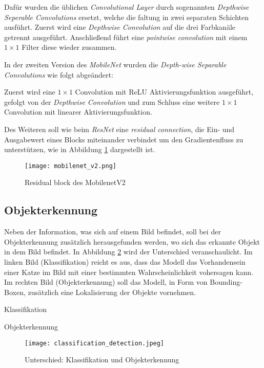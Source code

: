 Dafür wurden die üblichen \textit{Convolutional Layer}
durch sogenannten \textit{Depthwise Seperable 
Convolutions} ersetzt, welche die \Gls{faltung} in zwei separaten 
Schichten ausführt. Zuerst wird eine \textit{Depthwise  
Convolution} auf die drei Farbkanäle getrennt ausgeführt.
Anschließend führt eine \textit{pointwise convolution}
mit einem $1\times1$ Filter diese wieder zusammen.


In der zweiten Version des \textit{MobileNet}
\cite{sandlerMobileNetV2InvertedResiduals2019}
wurden die \textit{Depth-wise Separable Convolutions}
wie folgt abgeändert:

Zuerst wird eine $1\times1$ Convolution mit ReLU
Aktivierungsfunktion ausgeführt, gefolgt
von der \textit{Depthwise Convolution} und zum 
Schluss eine weitere $1\times1$ Convolution 
mit linearer Aktivierungsfunktion.


Des Weiteren soll wie beim \textit{ResNet} eine 
\textit{residual connection}, die Ein- und
Ausgabewert eines Blocks miteinander verbindet um
den Gradientenfluss zu unterstützen, wie in Abbildung 
\ref{fig:mobilenetv2} dargestellt ist.
\vspace{1cm}

\begin{figure}[H]
    \centering
    \texttt{[image: mobilenet\_v2.png]}
    \caption{Residual block des MobilenetV2
    \cite{sandlerMobileNetV2InvertedResiduals2019}}
    \label{fig:mobilenetv2}
\end{figure}


\subsection{Objekterkennung}\label{subsec:objdet_det}

Neben der Information, was sich auf einem Bild befindet, 
soll bei der Objekterkennung zusätzlich herausgefunden werden, 
wo sich das erkannte Objekt in dem Bild befindet.
In Abbildung \ref{fig:class_vs_det} wird der Unterschied 
veranschaulicht. Im linken Bild (Klassifikation) 
reicht es aus, dass das Modell das Vorhandensein einer Katze
im Bild mit einer bestimmten Wahrscheinlichkeit vohersagen kann.
Im rechten Bild (Objekterkennung) soll das Modell,
in Form von Bounding-Boxen, zusätzlich eine Lokalisierung
der Objekte vornehmen.

\vspace{1cm}
\begin{minipage}{0.5\textwidth}
    \centering
    Klassifikation
\end{minipage}
\begin{minipage}{0.5\textwidth}
    \centering
    Objekterkennung
\end{minipage}
\begin{figure}[H]
    \centering
    \texttt{[image: classification\_detection.jpeg]}
    \caption{Unterschied: Klassifikation und Objekterkennung 
    \cite{catDog}}
    \label{fig:class_vs_det}
\end{figure}
\vspace{1cm}

